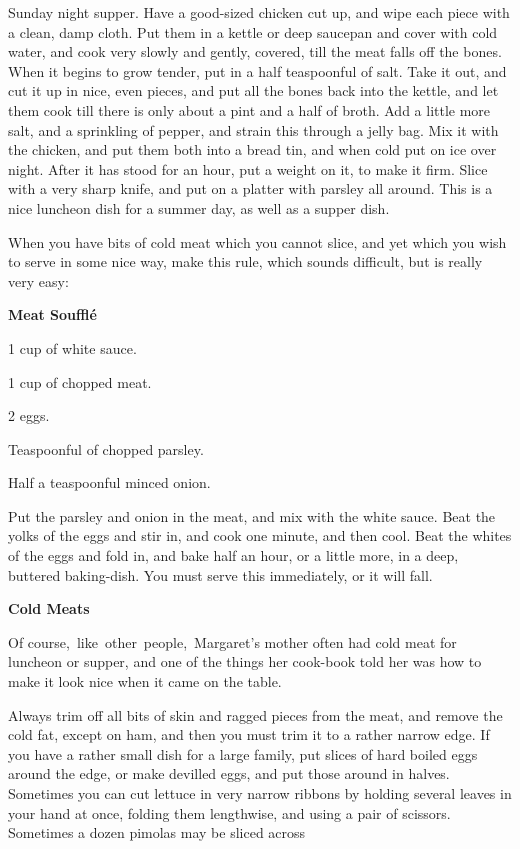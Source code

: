 \documentclass[11pt]{book}
\newcommand{\indpar}{\par\noindent\hspace*{\parindent}}
\newcommand{\ingredient}{\indpar}
\newcommand{\instruction}{\indpar}
\newenvironment{RecipeTitle}{\medskip\begin{center}\large\bf }{\end{center}\smallskip}
\begin{document}
Sunday night supper.  Have a good-sized chicken cut up,
and wipe each piece with a clean, damp cloth.  Put them
in a kettle or deep saucepan and cover with cold water,
and cook very slowly and gently, covered, till the meat
falls off the bones.  When it begins to grow tender,
put in a half teaspoonful of salt.  Take it out, and cut
it up in nice, even pieces, and put all the bones back
into the kettle, and let them cook till there is only
about a pint and a half of broth.  Add a little more
salt, and a sprinkling of pepper, and strain this through
a jelly bag.  Mix it with the chicken, and put them both
into a bread tin, and when cold put on ice over night.
After it has stood for an hour, put a weight on it, to
make it firm.  Slice with a very sharp knife, and put on
a platter with parsley all around.  This is a nice
luncheon dish for a summer day, as well as a supper dish.
\medskip
\instruction
  When you have bits of cold meat which you cannot slice,
and yet which you wish to serve in some nice way, make
this rule, which sounds difficult, but is really very easy:
\begin{RecipeTitle}
Meat Souffl\'{e}\label{meat_souffle}
\end{RecipeTitle}
\ingredient  1 cup of white sauce.
\ingredient  1 cup of chopped meat.
\ingredient  2 eggs.
\ingredient  Teaspoonful of chopped parsley.
\ingredient  Half a teaspoonful minced onion.
\instruction
  Put the parsley and onion in the meat, and mix with
the white sauce.  Beat the yolks of the eggs and stir in,
and cook one minute, and then cool.  Beat the whites of the
eggs and fold in, and bake half an hour, or a little more,
in a deep, buttered baking-dish.  You must serve this
immediately, or it will fall.
\begin{RecipeTitle}
Cold Meats\label{cold_meats}
\end{RecipeTitle}
\instruction
  Of course,\, like\, other\, people,\, Margaret's mother often had
cold meat for luncheon or supper, and one of the things her
cook-book told her was how to make it look nice when it
came on the table.
\instruction
  Always trim off all bits of skin and ragged pieces from
the meat, and remove the cold fat, except on ham, and then
you must trim it to a rather narrow edge.  If you have a
rather small dish for a large family, put slices of hard
boiled eggs around the edge, or make devilled eggs, and put
those around in halves.  Sometimes you can cut lettuce in
very narrow ribbons by holding several leaves in your hand
at once, folding them lengthwise, and using a pair of
scissors.  Sometimes a dozen pimolas may be sliced across
\end{document}
